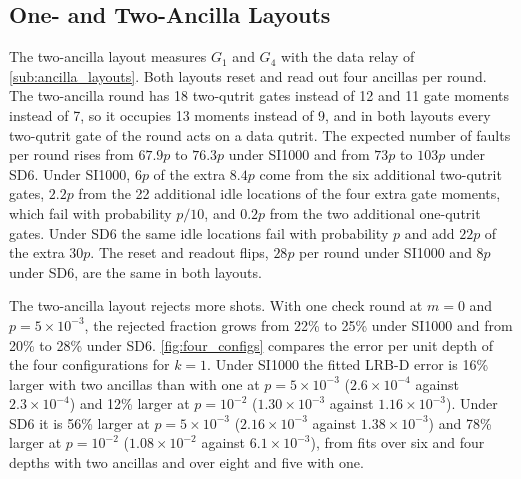 \subsection{One- and Two-Ancilla Layouts}
\label{sub:layout_comparison}

The two-ancilla layout measures $G_1$ and $G_4$ with the data relay of \autoref{sub:ancilla_layouts}. Both layouts reset and read out four ancillas per round. The two-ancilla round has 18 two-qutrit gates instead of 12 and 11 gate moments instead of 7, so it occupies 13 moments instead of 9, and in both layouts every two-qutrit gate of the round acts on a data qutrit. The expected number of faults per round rises from $67.9p$ to $76.3p$ under SI1000 and from $73p$ to $103p$ under SD6. Under SI1000, $6p$ of the extra $8.4p$ come from the six additional two-qutrit gates, $2.2p$ from the 22 additional idle locations of the four extra gate moments, which fail with probability $p/10$, and $0.2p$ from the two additional one-qutrit gates. Under SD6 the same idle locations fail with probability $p$ and add $22p$ of the extra $30p$. The reset and readout flips, $28p$ per round under SI1000 and $8p$ under SD6, are the same in both layouts.

The two-ancilla layout rejects more shots. With one check round at $m = 0$ and $p = 5\times10^{-3}$, the rejected fraction grows from 22\% to 25\% under SI1000 and from 20\% to 28\% under SD6. \autoref{fig:four_configs} compares the error per unit depth of the four configurations for $k = 1$. Under SI1000 the fitted LRB-D error is 16\% larger with two ancillas than with one at $p = 5\times10^{-3}$ ($2.6\times10^{-4}$ against $2.3\times10^{-4}$) and 12\% larger at $p = 10^{-2}$ ($1.30\times10^{-3}$ against $1.16\times10^{-3}$). Under SD6 it is 56\% larger at $p = 5\times10^{-3}$ ($2.16\times10^{-3}$ against $1.38\times10^{-3}$) and 78\% larger at $p = 10^{-2}$ ($1.08\times10^{-2}$ against $6.1\times10^{-3}$), from fits over six and four depths with two ancillas and over eight and five with one.

